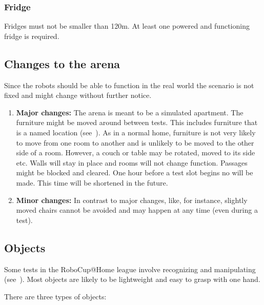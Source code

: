\subsubsection{Fridge}
Fridges must not be smaller than 120m. At least one powered and functioning fridge is required.


\subsection{Changes to the arena}
\label{rule:scenario_changes}

Since the robots should be able to function in the real world the scenario is not fixed and might change without further notice.
\begin{enumerate}
	\item \textbf{Major changes:}
	The arena is meant to be a simulated apartment.
	The furniture might be moved around between tests.
	This includes furniture that is a named location (see~).
	As in a normal home, furniture is not very likely to move from one room to another and is unlikely to be moved to the other side of a room.
	However, a couch or table may be rotated, moved to its side etc.
	Walls will stay in place and rooms will not change function.
	Passages might be blocked and cleared.
	One hour before a test slot begins no  will be made.
	This time will be shortened in the future.

	\item \textbf{Minor changes:} In contrast to major changes,  like, for instance, slightly moved chairs cannot be avoided and may happen at any time (even during a test).
\end{enumerate}


%
%
\def\NumObjects{30\ }
\def\NumLocations{20\ }
\def\NumNames{20\ }

\subsection{Objects}
\label{rule:scenario_objects}
Some tests in the RoboCup@Home league involve recognizing and manipulating  (see~).
Most objects are likely to be lightweight and easy to grasp with one hand.

There are three types of objects:

